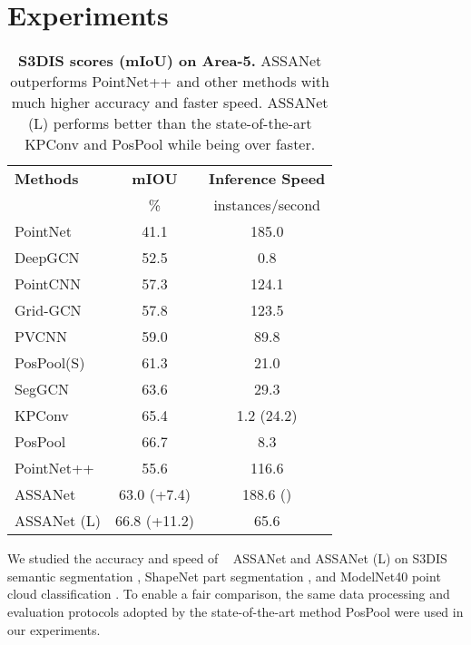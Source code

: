 \documentclass{article}
\newcommand{\R}[1]{\textcolor[rgb]{1.00,0.00,0.00}{#1}}
\begin{document}
 \section{Experiments}\label{sec:experiments}
\begin{wraptable}{r}{8cm}
\vspace{-20mm}
\centering
\begin{tabular}{lcc}
\midrule
\textbf{Methods} & \textbf{mIOU} & \textbf{Inference Speed} \\
& \% & instances/second \\
\midrule
PointNet \cite{Qi2017PointNetDL}	& 41.1 & 185.0 \\
DeepGCN \cite{Li2019DeepGCNs}    & 52.5 & 0.8 \\
PointCNN \cite{PointCNN}	   & 57.3 & 124.1 \\
Grid-GCN \cite{Xu2020GridGCNFF} & 57.8 & 123.5 \\ 
PVCNN \cite{Liu2019PointVoxelCF} & 59.0 & 89.8 \\
PosPool(S) \cite{Liu2020ACL}	& 61.3 & 21.0\\
SegGCN \cite{Lei2020SegGCNE3} & 63.6 & 29.3\\ 
KPConv \cite{Thomas2019KPConvFA} & 65.4 & 1.2 (24.2) \\
PosPool \cite{Liu2020ACL}	& 66.7& 8.3\\
\midrule
PointNet++ \cite{Qi2017PointNetDH}	&  55.6 & 116.6 \\
ASSANet & 63.0 \R{(+7.4)} & 188.6 \R{()}\\
ASSANet (L) & 66.8 \R{(+11.2)} & 65.6\\
\bottomrule
\end{tabular}
\caption{\textbf{S3DIS scores (mIoU) on Area-5.} ASSANet outperforms PointNet++ and other methods with much higher accuracy and faster speed. ASSANet (L) performs better than the state-of-the-art KPConv \cite{Thomas2019KPConvFA} and PosPool \cite{Liu2020ACL} while being over  faster. 
}
\label{tab:s3dis_sota}
\vspace{-10mm}
\end{wraptable}
We studied the accuracy and speed of ~ ASSANet and ASSANet (L) on S3DIS semantic segmentation \cite{s3dis}, ShapeNet part segmentation \cite{shapenet2015}, and ModelNet40 point cloud classification \cite{ben20183dmfv}. To enable a fair comparison, the same data processing and evaluation protocols adopted by the state-of-the-art method PosPool  \cite{Liu2020ACL} were used in our experiments.
\end{document}
